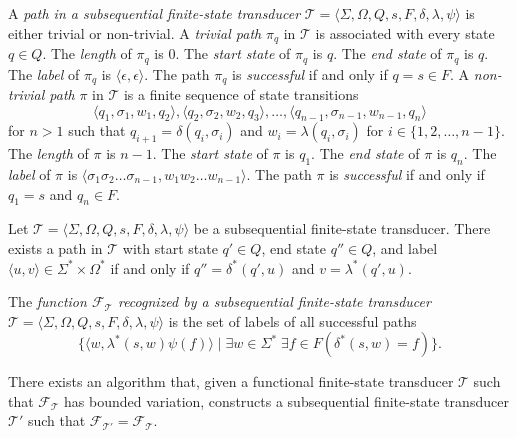 \begin{definition}
  A \emph{path in a subsequential finite-state transducer} $\mathcal{T} = \langle
  \Sigma, \Omega, Q, s, F, \delta, \lambda, \psi \rangle$ is either trivial or
  non-trivial. A \emph{trivial path} $\pi_q$ in $\mathcal{T}$ is associated with every state
  $q \in Q$. The \emph{length} of $\pi_q$ is $0$. The \emph{start state} of $\pi_q$ is $q$. The
  \emph{end state} of $\pi_q$ is $q$. The \emph{label} of $\pi_q$ is $\langle \epsilon, \epsilon
  \rangle$. The path $\pi_q$ is \emph{successful} if and only if $q = s \in F$. A
  \emph{non-trivial path} $\pi$ in $\mathcal{T}$ is a finite sequence of state transitions
  \begin{equation*}
    \langle q_1, \sigma_1, w_1, q_2 \rangle, \langle q_2, \sigma_2, w_2, q_3 \rangle,
    \dots, \langle q_{n-1}, \sigma_{n-1}, w_{n-1}, q_n \rangle
  \end{equation*}
  for $n > 1$ such that $q_{i+1} = \delta(q_i, \sigma_i)$ and $w_i = \lambda(q_i,
  \sigma_i)$ for $i \in \{ 1, 2, \ldots, n-1 \}$. The \emph{length} of $\pi$ is $n-1$. The
  \emph{start state} of $\pi$ is $q_1$. The \emph{end state} of $\pi$ is $q_n$. The \emph{label} of $\pi$
  is $\langle \sigma_1 \sigma_2 \ldots \sigma_{n-1}, w_1 w_2 \ldots w_{n-1} \rangle$.
  The path $\pi$ is \emph{successful} if and only if $q_1 = s$ and $q_n \in F$.
\end{definition}

\begin{proposition}
  Let $\mathcal{T} = \langle \Sigma, \Omega, Q, s, F, \delta, \lambda, \psi \rangle$
  be a subsequential finite-state transducer. There exists a path in $\mathcal{T}$
  with start state $q' \in Q$, end state $q'' \in Q$, and label $\langle u, v \rangle
  \in \Sigma^* \times \Omega^*$ if and only if $q'' = \delta^*(q', u)$ and $v =
  \lambda^*(q', u)$.
\end{proposition}

\begin{definition}
  The \emph{function $\mathcal{F}_\mathcal{T}$ recognized by a subsequential
  finite-state transducer} $\mathcal{T} = \langle \Sigma, \Omega, Q, s, F, \delta,
  \lambda, \psi \rangle$ is the set of labels of all successful paths
  \begin{equation*}
    \{ \langle w, \lambda^*(s, w) \psi(f) \rangle \mid
    \exists w \in \Sigma^* \; \exists f \in F (\delta^*(s, w) = f) \}.
  \end{equation*}
\end{definition}

\begin{theorem}
  \label{thm:choffrut_mohri}
  There exists an algorithm that, given a functional finite-state transducer
  $\mathcal{T}$ such that $\mathcal{F}_\mathcal{T}$ has bounded variation, constructs
  a subsequential finite-state transducer $\mathcal{T'}$ such that
  $\mathcal{F}_\mathcal{T'} = \mathcal{F}_\mathcal{T}$.
\end{theorem}

